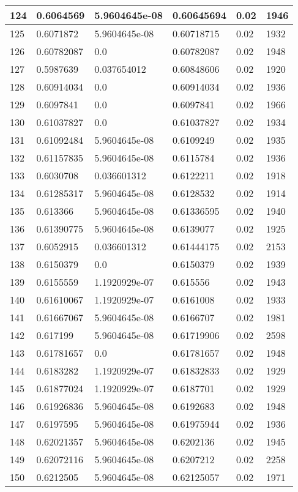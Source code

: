 \begin{longtable}{|l|l|l|l|l|l|}
124 & 0.6064569 & 5.9604645e-08 & 0.60645694 & 0.02 & 1946 \\ \hline 
125 & 0.6071872 & 5.9604645e-08 & 0.60718715 & 0.02 & 1932 \\ \hline 
126 & 0.60782087 & 0.0 & 0.60782087 & 0.02 & 1948 \\ \hline 
127 & 0.5987639 & 0.037654012 & 0.60848606 & 0.02 & 1920 \\ \hline 
128 & 0.60914034 & 0.0 & 0.60914034 & 0.02 & 1936 \\ \hline 
129 & 0.6097841 & 0.0 & 0.6097841 & 0.02 & 1966 \\ \hline 
130 & 0.61037827 & 0.0 & 0.61037827 & 0.02 & 1934 \\ \hline 
131 & 0.61092484 & 5.9604645e-08 & 0.6109249 & 0.02 & 1935 \\ \hline 
132 & 0.61157835 & 5.9604645e-08 & 0.6115784 & 0.02 & 1936 \\ \hline 
133 & 0.6030708 & 0.036601312 & 0.6122211 & 0.02 & 1918 \\ \hline 
134 & 0.61285317 & 5.9604645e-08 & 0.6128532 & 0.02 & 1914 \\ \hline 
135 & 0.613366 & 5.9604645e-08 & 0.61336595 & 0.02 & 1940 \\ \hline 
136 & 0.61390775 & 5.9604645e-08 & 0.6139077 & 0.02 & 1925 \\ \hline 
137 & 0.6052915 & 0.036601312 & 0.61444175 & 0.02 & 2153 \\ \hline 
138 & 0.6150379 & 0.0 & 0.6150379 & 0.02 & 1939 \\ \hline 
139 & 0.6155559 & 1.1920929e-07 & 0.615556 & 0.02 & 1943 \\ \hline 
140 & 0.61610067 & 1.1920929e-07 & 0.6161008 & 0.02 & 1933 \\ \hline 
141 & 0.61667067 & 5.9604645e-08 & 0.6166707 & 0.02 & 1981 \\ \hline 
142 & 0.617199 & 5.9604645e-08 & 0.61719906 & 0.02 & 2598 \\ \hline 
143 & 0.61781657 & 0.0 & 0.61781657 & 0.02 & 1948 \\ \hline 
144 & 0.6183282 & 1.1920929e-07 & 0.61832833 & 0.02 & 1929 \\ \hline 
145 & 0.61877024 & 1.1920929e-07 & 0.6187701 & 0.02 & 1929 \\ \hline 
146 & 0.61926836 & 5.9604645e-08 & 0.6192683 & 0.02 & 1948 \\ \hline 
147 & 0.6197595 & 5.9604645e-08 & 0.61975944 & 0.02 & 1936 \\ \hline 
148 & 0.62021357 & 5.9604645e-08 & 0.6202136 & 0.02 & 1945 \\ \hline 
149 & 0.62072116 & 5.9604645e-08 & 0.6207212 & 0.02 & 2258 \\ \hline 
150 & 0.6212505 & 5.9604645e-08 & 0.62125057 & 0.02 & 1971 \\ \hline 
\end{longtable}